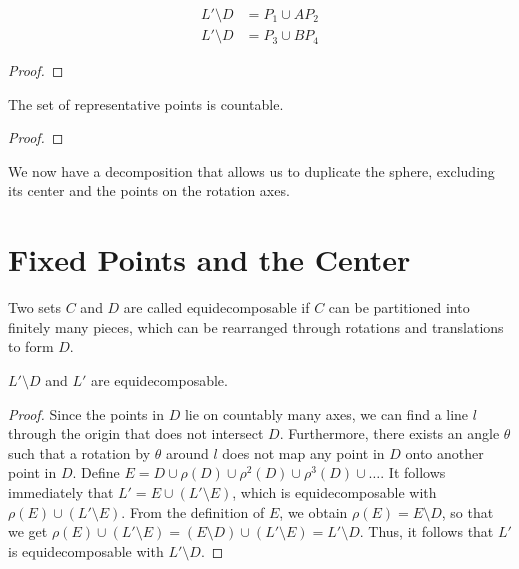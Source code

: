 \begin{lemma}[Doubling of L' \ D] \label{lemma:doubling_L_D}
\begin{align*}
L' \setminus D &= P_1 \cup A P_2 \\
L' \setminus D &= P_3 \cup B P_4
\end{align*}
\end{lemma}
\begin{proof} 
\end{proof}

\begin{lemma} \label{lemma:count_set_rep_points}
The set of representative points is countable.
\end{lemma}
\begin{proof}
\end{proof}

We now have a decomposition that allows us to duplicate the sphere, excluding its center and the points on the rotation axes.

\section{Fixed Points and the Center}

\begin{definition}[Equidecomposability] \label{def:equidecomposable}
Two sets $C$ and $D$ are called equidecomposable if $C$ can be partitioned into finitely many pieces, which can be rearranged through rotations and translations to form $D$.
\end{definition}

\begin{lemma} \label{lem:equidecomposability}
$L' \setminus D$ and $L'$ are equidecomposable.
\end{lemma}
\begin{proof}
Since the points in $D$ lie on countably many axes, we can find a line $l$ through the origin that does not intersect $D$.
Furthermore, there exists an angle $\theta$ such that a rotation by $\theta$ around $l$ does not map any point in $D$ onto another point in $D$.
Define $E = D \cup \rho(D) \cup \rho^2(D) \cup \rho^3(D) \cup \dots$. It follows immediately that
$L' = E \cup (L' \setminus E)$, which is equidecomposable with $\rho(E) \cup (L' \setminus E)$.
From the definition of $E$, we obtain $\rho(E) = E \setminus D$, so that we get
$\rho(E) \cup (L' \setminus E) = (E \setminus D) \cup (L' \setminus E) = L' \setminus D$.
Thus, it follows that $L'$ is equidecomposable with $L' \setminus D$.
\end{proof}


